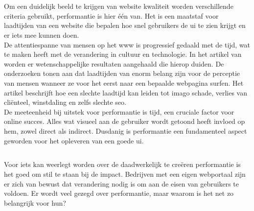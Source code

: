 \section{}
\label{sec:performantie}

Om een duidelijk beeld te krijgen van website kwaliteit worden verschillende criteria gebruikt, performantie is hier één van. Het is een maatstaf voor laadtijden van een website die bepalen hoe snel gebruikers de \gls{ui} te zien krijgt en er iets mee kunnen doen.\\
De attentiespanne van mensen op het \gls{www} is progressief gedaald met de tijd, wat te maken heeft met de verandering in cultuur en technologie. In het artikel van~\textcite{Carette2011} worden er wetenschappelijke resultaten aangehaald die hierop duiden. De onderzoeken tonen aan dat laadtijden van enorm belang zijn voor de perceptie van mensen wanneer ze voor het eerst naar een bepaalde webpagina surfen. Het artikel beschrijft hoe een slechte laadtijd kan leiden tot imago schade, verlies van cliënteel, winstdaling en zelfs slechte \gls{seo}.\\
De meeteenheid bij uitstek voor performantie is tijd, een cruciale factor voor online succes. Alles wat visueel aan de gebruiker wordt getoond heeft invloed op hem, zowel direct als indirect. Dusdanig is performantie een fundamenteel aspect geworden voor het opleveren van een goede \gls{ui}.

\subsection{}
\label{sec:whyPerformance}

Voor iets kan weerlegt worden over de daadwerkelijk te creëren performantie is het goed om stil te staan bij de impact. Bedrijven met een eigen webportaal zijn er zich van bewust dat verandering nodig is om aan de eisen van gebruikers te voldoen. Er wordt veel gezegd over performantie, maar waarom is het net zo belangrijk voor hun?

\subsubsection{}
\label{sec:sales}

